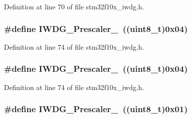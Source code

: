 Definition at line 70 of file stm32f10x\+\_\+iwdg.\+h.

\subsubsection[{\texorpdfstring{I\+W\+D\+G\+\_\+\+Prescaler\+\_\+64}{IWDG_Prescaler_64}}]{\setlength{\rightskip}{0pt plus 5cm}\#define I\+W\+D\+G\+\_\+\+Prescaler\+\_~(({\bf uint8\+\_\+t})0x04)}\hypertarget{group___i_w_d_g__prescaler_ga7ea813c73ae0acb40acb60e7d3956910}{}\label{group___i_w_d_g__prescaler_ga7ea813c73ae0acb40acb60e7d3956910}


Definition at line 74 of file stm32f10x\+\_\+iwdg.\+h.

\subsubsection[{\texorpdfstring{I\+W\+D\+G\+\_\+\+Prescaler\+\_\+64}{IWDG_Prescaler_64}}]{\setlength{\rightskip}{0pt plus 5cm}\#define I\+W\+D\+G\+\_\+\+Prescaler\+\_~(({\bf uint8\+\_\+t})0x04)}\hypertarget{group___i_w_d_g__prescaler_ga7ea813c73ae0acb40acb60e7d3956910}{}\label{group___i_w_d_g__prescaler_ga7ea813c73ae0acb40acb60e7d3956910}


Definition at line 74 of file stm32f10x\+\_\+iwdg.\+h.

\subsubsection[{\texorpdfstring{I\+W\+D\+G\+\_\+\+Prescaler\+\_\+8}{IWDG_Prescaler_8}}]{\setlength{\rightskip}{0pt plus 5cm}\#define I\+W\+D\+G\+\_\+\+Prescaler\+\_~(({\bf uint8\+\_\+t})0x01)}\hypertarget{group___i_w_d_g__prescaler_ga59763b9a127c67adf5d11474188996a1}{}\label{group___i_w_d_g__prescaler_ga59763b9a127c67adf5d11474188996a1}


